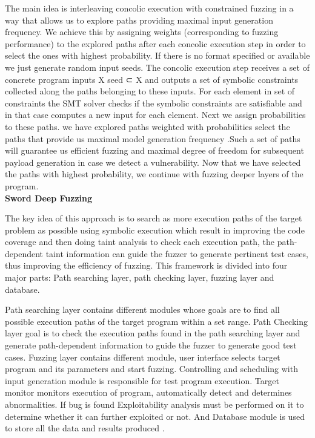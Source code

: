 \documentclass[a4paper, 11pt]{article}
\begin{document}
The main idea is interleaving concolic execution with constrained fuzzing in a way that allows us to explore paths providing maximal input generation frequency. We achieve this by assigning weights (corresponding to fuzzing performance) to the explored paths after each concolic execution step in order to select the ones with highest
probability. If there is no format specified or available we just generate random input seeds. The concolic execution step receives a set of concrete program inputs X seed ⊂ X and outputs a set of symbolic constraints collected along the paths belonging to
these inputs. For each element in set of constraints the SMT solver checks if the symbolic constraints are satisfiable and in that case computes a new input for each element. Next we assign probabilities to these paths. we have explored paths weighted with probabilities select the paths that provide us maximal model generation frequency \cite{deepfuzz}.Such a set of paths will guarantee us efficient fuzzing and maximal degree of freedom for subsequent payload generation in case we detect a vulnerability. Now that we have selected the paths with highest probability, we continue with fuzzing deeper layers of the program.\\

\noindent
\textbf{Sword Deep Fuzzing}

The key idea of this approach is to search as more execution paths of the target problem as possible using symbolic execution which result in improving the code coverage and then doing taint analysis to check each execution path, the path-dependent taint information can guide the fuzzer to generate pertinent test cases, thus improving the efficiency of fuzzing. This framework is divided into four major parts: Path searching layer, path checking layer, fuzzing layer and database. 

Path searching layer contains different modules whose goals are to find all possible execution paths of the target program within a set range. Path Checking layer goal is to check the execution paths found in the path searching layer and generate path-dependent information to guide the fuzzer to generate good test cases. Fuzzing layer contains different module, user interface selects target program and its parameters and start fuzzing. Controlling and scheduling with input generation module is responsible for test program execution. Target monitor monitors execution of program, automatically detect and determines abnormalities. If bug is found Exploitability analysis must be performed on it to determine whether it can further exploited or not. And Database module is used to store all the data and results produced \cite{autovuldeep}.\\
\end{document}
